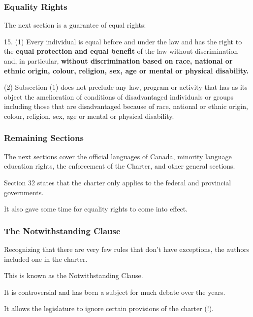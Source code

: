 \begin{frame}
\frametitle{Equality Rights}

The next section is a guarantee of equal rights:

15.	(1) Every individual is equal before and under the law and has 
	the right to the \textbf{equal protection and equal benefit} of the law
	without discrimination and, in particular, \textbf{without discrimination 
	based on race, national or ethnic origin, colour, religion, sex, age or mental or physical disability.}

(2) Subsection (1) does not preclude any law, program or 
	activity that has as its object the amelioration of conditions of 
	disadvantaged individuals or groups including those that are 
	disadvantaged because of race, national or ethnic origin, 
	colour, religion, sex, age or mental or physical disability.


\end{frame}



\begin{frame}
\frametitle{Remaining Sections}

	The next sections cover the official languages of Canada, minority language education rights, the enforcement of the Charter, and other general sections.
	
	Section 32 states that the charter only applies to the federal and provincial governments.
	
	It also gave some time for equality rights to come into effect.
	
\end{frame}



\begin{frame}
\frametitle{The Notwithstanding Clause}

Recognizing that there are very few rules that don't have exceptions, the authors included one in the charter.

This is known as the Notwithstanding Clause.

It is controversial and has been a subject for much debate over the years.

It allows the legislature to ignore certain provisions of the charter (!).

\end{frame}



